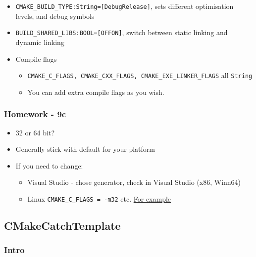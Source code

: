 \begin{itemize}
\itemsep1pt\parskip0pt
\item
  \texttt{CMAKE\_BUILD\_TYPE:String={[}Debug\textbar{}Release{]}}, sets
  different optimisation levels, and debug symbols
\item
  \texttt{BUILD\_SHARED\_LIBS:BOOL={[}OFF\textbar{}ON{]}}, switch
  between static linking and dynamic linking
\item
  Compile flags

  \begin{itemize}
  \itemsep1pt\parskip0pt
  \item
    \texttt{CMAKE\_C\_FLAGS, CMAKE\_CXX\_FLAGS, CMAKE\_EXE\_LINKER\_FLAGS}
    all \texttt{String}
  \item
    You can add extra compile flags as you wish.
  \end{itemize}
\end{itemize}

\subsubsection{Homework - 9c}\label{homework---9c}

\begin{itemize}
\itemsep1pt\parskip0pt
\item
  32 or 64 bit?
\item
  Generally stick with default for your platform
\item
  If you need to change:

  \begin{itemize}
  \itemsep1pt\parskip0pt
  \item
    Visual Studio - chose generator, check in Visual Studio (x86,
    Winn64)
  \item
    Linux \texttt{CMAKE\_C\_FLAGS = -m32} etc.
    \href{https://unix.stackexchange.com/questions/352783/how-can-i-build-and-run-32-bit-software-on-64-bit-debian}{For
    example}
  \end{itemize}
\end{itemize}

\subsection{CMakeCatchTemplate}\label{cmakecatchtemplate}

\subsubsection{Intro}\label{intro-1}

